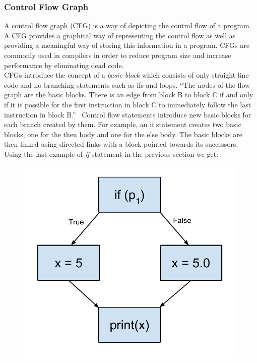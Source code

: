 \documentclass[12pt, titlepage]{article}
\begin{document}
\subsubsection{Control Flow Graph}
A control flow graph (CFG) is a way of depicting the control flow of a program. A CFG provides a graphical way of representing the control flow as well as providing a meaningful way of storing this information in a program. CFGs are commonly used in compilers in order to reduce program size and increase performance by eliminating dead code. \\
CFGs introduce the concept of a \textit{basic block} which consists of only straight line code and no branching statements such as ifs and loops. ``The nodes of the flow 
graph are the basic blocks. There is an edge from block B to block C if and 
only if it is possible for the first instruction in block C to immediately follow 
the last instruction in block B.''~\cite{dragonBook} Control flow statements introduce new basic blocks for each branch created by them. For example, an if statement creates two basic blocks, one for the then body and one for the else body. The basic blocks are then linked using directed links with a block pointed towards its successors. \\
Using the last example of \textit{if} statement in the previous section we get:
\begin{figure}[h]
\centering
\includegraphics[scale=0.4]{images/controlFlowGraph.pdf}
\end{figure}  \\
\end{document}
